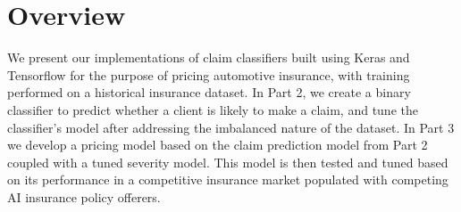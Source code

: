 \section{Overview}

We present our implementations of claim classifiers built using Keras and Tensorflow \cite{chollet2015keras,tensorflow} for the purpose of pricing automotive insurance, with training performed on a historical insurance dataset. In Part 2, we create a binary classifier to predict whether a client is likely to make a claim, and tune the classifier's model after addressing the imbalanced nature of the dataset. In Part 3 we develop a pricing model based on the claim prediction model from Part 2 coupled with a tuned severity model. This model is then tested and tuned based on its performance in a competitive insurance market populated with competing AI insurance policy offerers. 